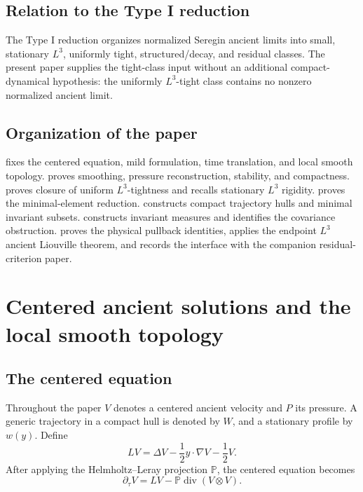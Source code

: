 \documentclass[11pt]{amsart}
\theoremstyle{plain}
\theoremstyle{definition}
\theoremstyle{remark}
\numberwithin{equation}{section}
\newcommand{\divergence}{\operatorname{div}}
\begin{document}
\subsection{Relation to the Type I reduction}

The Type I reduction organizes normalized Seregin ancient limits into small,
stationary \(L^3\), uniformly tight, structured/decay, and residual classes.
The present paper supplies the tight-class input without an additional
compact-dynamical hypothesis: the uniformly \(L^3\)-tight class contains no
nonzero normalized ancient limit.

\subsection{Organization of the paper}

 fixes the centered equation, mild formulation,
time translation, and local smooth topology.  
proves smoothing, pressure reconstruction, stability, and compactness.
 proves closure of uniform \(L^3\)-tightness and
recalls stationary \(L^3\) rigidity.   proves the
minimal-element reduction.   constructs compact
trajectory hulls and minimal invariant subsets.  
constructs invariant measures and identifies the covariance obstruction.
 proves the physical pullback identities,
applies the endpoint \(L^3\) ancient Liouville theorem, and records the
interface with the companion residual-criterion paper.

\section{Centered ancient solutions and the local smooth topology}
\label{sec:centered-topology}

\subsection{The centered equation}

Throughout the paper \(V\) denotes a centered ancient velocity and \(P\) its
pressure.  A generic trajectory in a compact hull is denoted by \(W\), and a
stationary profile by \(w(y)\).  Define
\[
   L V=\Delta V-\frac12 y\cdot\nabla V-\frac12 V .
\]
After applying the Helmholtz--Leray projection \(\mathbb P\), the centered
equation becomes
\begin{equation}\label{eq:projected}
   \partial_\tau V
   =
   LV-\mathbb P\divergence(V\otimes V).
\end{equation}
\end{document}
